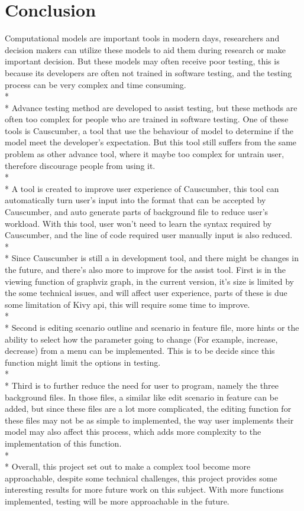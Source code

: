\chapter{Conclusion}
Computational models are important tools in modern days, researchers and decision makers can utilize these models to aid them during research or make important decision. But these models may often receive poor testing, this is because its developers are often not trained in software testing, and the testing process can be very complex and time consuming. \\*\\*
Advance testing method are developed to assist testing, but these methods are often too complex for people who are trained in software testing. One of these tools is Causcumber, a tool that use the behaviour of model to determine if the model meet the developer’s expectation. But this tool still suffers from the same problem as other advance tool, where it maybe too complex for untrain user, therefore discourage people from using it. \\*\\*
A tool is created to improve user experience of Causcumber, this tool can automatically turn user’s input into the format that can be accepted by Causcumber, and auto generate parts of background file to reduce user’s workload. With this tool, user won’t need to learn the syntax required by Causcumber, and the line of code required user manually input is also reduced.\\*\\*
Since Causcumber is still a in development tool, and there might be changes in the future, and there’s also more to improve for the assist tool. First is in the viewing function of graphviz graph, in the current version, it’s size is limited by the some technical issues, and will affect user experience, parts of these is due some limitation of Kivy api, this will require some time to improve. \\*\\*
Second is editing scenario outline and scenario in feature file, more hints or the ability to select how the parameter going to change (For example, increase, decrease) from a menu can be implemented. This is to be decide since this function might limit the options in testing. \\*\\*
Third is to further reduce the need for user to program, namely the three background files. In those files, a similar like edit scenario in feature can be added, but since these files are a lot more complicated, the editing function for these files may not be as simple to implemented, the way user implements their model may also affect this process, which adds more complexity to the implementation of this function.\\*\\* 
Overall, this project set out to make a complex tool become more approachable, despite some technical challenges, this project provides some interesting results for more future work on this subject. With more functions implemented, testing will be more approachable in the future.

